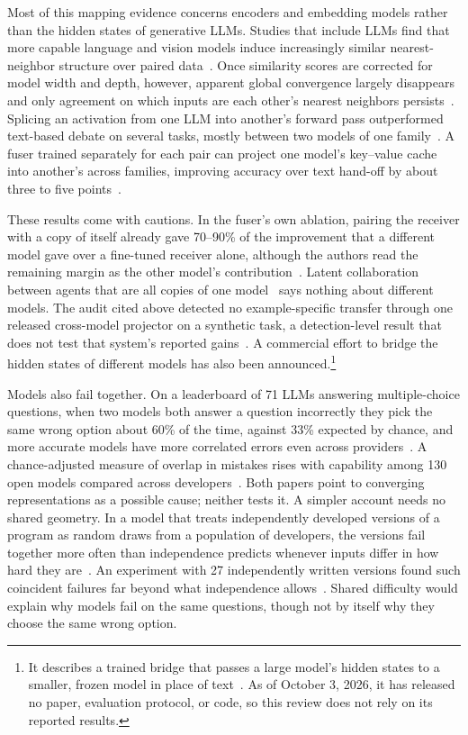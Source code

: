 \documentclass{ieeeaccess}
\begin{document}
Most of this mapping evidence concerns encoders and embedding models rather than the hidden states of generative LLMs. Studies that include LLMs find that more capable language and vision models induce increasingly similar nearest-neighbor structure over paired data~\cite{huh2024platonic}. Once similarity scores are corrected for model width and depth, however, apparent global convergence largely disappears and only agreement on which inputs are each other's nearest neighbors persists~\cite{groger2026aristotelian}. Splicing an activation from one LLM into another's forward pass outperformed text-based debate on several tasks, mostly between two models of one family~\cite{ramesh2025activations}. A fuser trained separately for each pair can project one model's key--value cache into another's across families, improving accuracy over text hand-off by about three to five points~\cite{fu2026c2c}.

These results come with cautions. In the fuser's own ablation, pairing the receiver with a copy of itself already gave 70--90\% of the improvement that a different model gave over a fine-tuned receiver alone, although the authors read the remaining margin as the other model's contribution~\cite{fu2026c2c}. Latent collaboration between agents that are all copies of one model~\cite{zou2026latentmas} says nothing about different models. The audit cited above detected no example-specific transfer through one released cross-model projector on a synthetic task, a detection-level result that does not test that system's reported gains~\cite{cheng2026audit}. A commercial effort to bridge the hidden states of different models has also been announced.\footnote{It describes a trained bridge that passes a large model's hidden states to a smaller, frozen model in place of text~\cite{mostik2026bridge}. As of October 3, 2026, it has released no paper, evaluation protocol, or code, so this review does not rely on its reported results.}

Models also fail together. On a leaderboard of 71 LLMs answering multiple-choice questions, when two models both answer a question incorrectly they pick the same wrong option about 60\% of the time, against 33\% expected by chance, and more accurate models have more correlated errors even across providers~\cite{kim2025correlated}. A chance-adjusted measure of overlap in mistakes rises with capability among 130 open models compared across developers~\cite{goel2025think}. Both papers point to converging representations as a possible cause; neither tests it. A simpler account needs no shared geometry. In a model that treats independently developed versions of a program as random draws from a population of developers, the versions fail together more often than independence predicts whenever inputs differ in how hard they are~\cite{eckhardt1985theoretical}. An experiment with 27 independently written versions found such coincident failures far beyond what independence allows~\cite{knight1986experimental}. Shared difficulty would explain why models fail on the same questions, though not by itself why they choose the same wrong option.
\end{document}
